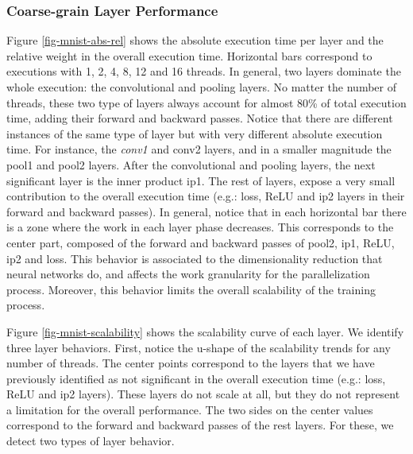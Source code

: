 \subsubsection{Coarse-grain Layer Performance}
Figure \ref{fig-mnist-abs-rel} shows the absolute execution time per layer 
and the relative weight in the overall execution time. Horizontal bars 
correspond to executions with 1, 2, 4, 8, 12 and 16 threads. In general, 
two layers dominate the whole execution: the convolutional and pooling 
layers. No matter the number of threads, these two type of layers always 
account for almost 80\% of total execution time, adding their forward 
and backward passes. Notice that there are different instances of the 
same type of layer but with very different absolute execution time. 
For instance, the \emph{conv1} and conv2 layers, and in a smaller magnitude 
the pool1 and pool2 layers. After the convolutional and pooling layers, 
the next significant layer is the inner product ip1. The rest of layers, 
expose a very small contribution to the overall execution time 
(e.g.: loss, ReLU and ip2 layers in their forward and backward passes).
In general, notice that in each horizontal bar there is a zone where the 
work in each layer phase decreases. This corresponds to the center part, 
composed of the forward and backward passes of pool2, ip1, ReLU, ip2 and loss.
This behavior is associated to the dimensionality reduction that neural 
networks do, and affects the work granularity for the parallelization process.
Moreover, this behavior limits the overall scalability of the training process.

Figure \ref{fig-mnist-scalability} shows the scalability curve of each layer. 
We identify three layer behaviors. First, notice the u-shape of the 
scalability trends for any number of threads. The center points 
correspond to the layers that we have previously identified as not 
significant in the overall execution time (e.g.: loss, ReLU and ip2 layers). 
These layers do not scale at all, but they do not represent a limitation for 
the overall performance. The two sides on the center values correspond 
to the forward and backward passes of the rest layers. For these, we detect 
two types of layer behavior. 

